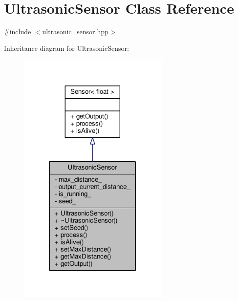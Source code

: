 \hypertarget{class_ultrasonic_sensor}{}\section{Ultrasonic\+Sensor Class Reference}
\label{class_ultrasonic_sensor}


{\ttfamily \#include $<$ultrasonic\+\_\+sensor.\+hpp$>$}



Inheritance diagram for Ultrasonic\+Sensor\+:
\nopagebreak
\begin{figure}[H]
\begin{center}
\leavevmode
\includegraphics[width=212pt]{class_ultrasonic_sensor__inherit__graph}
\end{center}
\end{figure}
